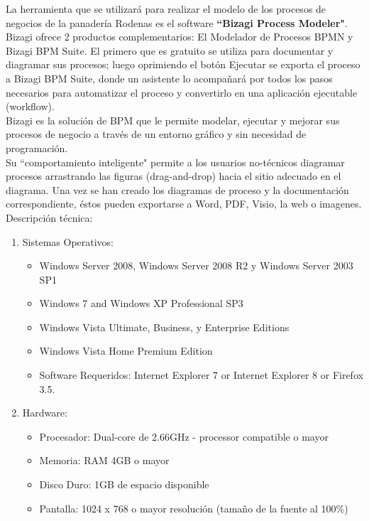 La herramienta que se utilizará para realizar el modelo de los procesos de negocios de la panadería Rodenas es el software \textbf{``Bizagi Process Modeler"}.
\\

Bizagi ofrece 2 productos complementarios: El Modelador de Procesos BPMN y Bizagi BPM Suite. El primero que es gratuito se utiliza para documentar y diagramar sus procesos; luego oprimiendo el botón Ejecutar se exporta el proceso a Bizagi BPM Suite, donde un asistente lo acompañará por todos los pasos necesarios para automatizar el proceso y convertirlo en una aplicación ejecutable (workflow).
\\
Bizagi es la solución de BPM que le permite modelar, ejecutar y mejorar sus procesos de negocio a través de un entorno gráfico y sin necesidad de programación.
\\
Su ``comportamiento inteligente" permite a los usuarios no-técnicos diagramar procesos arrastrando las figuras (drag-and-drop) hacia el sitio adecuado en el diagrama. Una vez se han creado los diagramas de proceso y la documentación correspondiente, éstos pueden exportarse a Word, PDF, Visio, la web o imagenes.
\\
Descripción técnica:
\begin{enumerate}

\item Sistemas Operativos:
\begin{itemize}
\item Windows Server 2008, Windows Server 2008 R2 y Windows Server 2003 SP1
\item Windows 7 and Windows XP Professional SP3 
\item Windows Vista Ultimate, Business, y Enterprise Editions
\item Windows Vista Home Premium Edition
\\
\item Software Requeridos: Internet Explorer 7 or Internet Explorer 8 or Firefox 3.5.
\end{itemize}

\item Hardware:
\begin{itemize}
\item Procesador: Dual-core de 2.66GHz - processor compatible o mayor
\item Memoria: RAM 4GB o mayor
\item Disco Duro: 1GB de espacio disponible
\item Pantalla: 1024 x 768 o mayor resolución (tamaño de la fuente al 100\%)
\end{itemize}
\end{enumerate}



